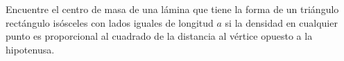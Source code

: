 \item Encuentre el centro de masa de una lámina que tiene la forma de un triángulo rectángulo isósceles con lados iguales de longitud $a$ si la densidad en cualquier punto es proporcional al cuadrado de la distancia al vértice opuesto a la hipotenusa.
